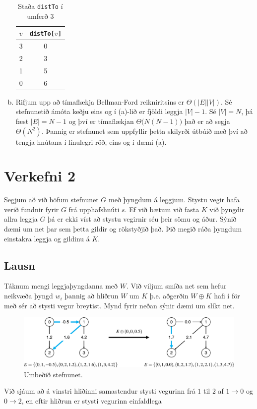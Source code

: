 \documentclass[12pt, a4paper, hidelinks]{article}
\begin{document}
\begin{enumerate}[(a)]
    \begin{table}[H]
        \centering
        \caption{Staða \texttt{distTo} í umferð 3}
        \begin{tabular}{lc}
            \toprule
            $v$ & \texttt{distTo[$v$]} \\
            \midrule
            3   & 0        \\
            2   & 3         \\
            1   & 5 \\
            0   & 6 \\
            \bottomrule
        \end{tabular}
        \label{tab:my_label}
    \end{table}
    
    \item Rifjum upp að tímaflækja Bellman-Ford reikniritsins er $\Theta(|E||V|)$. Sé stefnunetið ámóta keðju eins og í (a)-lið er fjöldi leggja $|V| - 1$. Sé $|V| = N$, þá fæst $|E| = N - 1$ og því er tímaflækjan
    $\Theta\big(N(N - 1)\big)$ það er að segja $\Theta(N^2)$. Þannig er stefnunet sem uppfyllir þetta skilyrði útbúið með því að tengja hnútana í línulegri röð, eins og í dæmi (a).
\end{enumerate}

\newpage

\section*{Verkefni 2}
Segjum að við höfum stefnunet $G$ með þyngdum á leggjum. Stystu vegir hafa verið fundnir fyrir $G$ frá upphafshnúti $s$. Ef við bætum við fasta $K$ við þyngdir allra leggja $G$ þá er ekki víst að stystu vegirnir séu þeir sömu og áður. Sýnið dæmi um net þar sem þetta gildir og rökstyðjið það. Þið megið ráða þyngdum einstakra leggja og gildinu á $K$.

\subsection*{Lausn}
Táknum mengi leggjaþyngdanna með $W$. Við viljum smíða net sem hefur neikvæða þyngd $w_i$ þannig að hliðrun $W$ um $K$ þ.e. aðgerðin $W \oplus K$ hafi í för með sér að stysti vegur breytist. Mynd fyrir neðan sýnir dæmi um slíkt net.

\begin{figure}[H]
    \centering
    \includegraphics[width=\textwidth]{HD11/pdf/img/V2-soln.png}
    \caption{Umbeðið stefnunet.}
    \label{fig:V2-soln}
\end{figure}
\noindent
Við sjáum að á vinstri hliðinni samastendur stysti vegurinn frá $1$ til $2$ af $1 \to 0$ og
$0 \to 2$, en eftir hliðrun er stysti vegurinn einfaldlega $$
\end{document}
